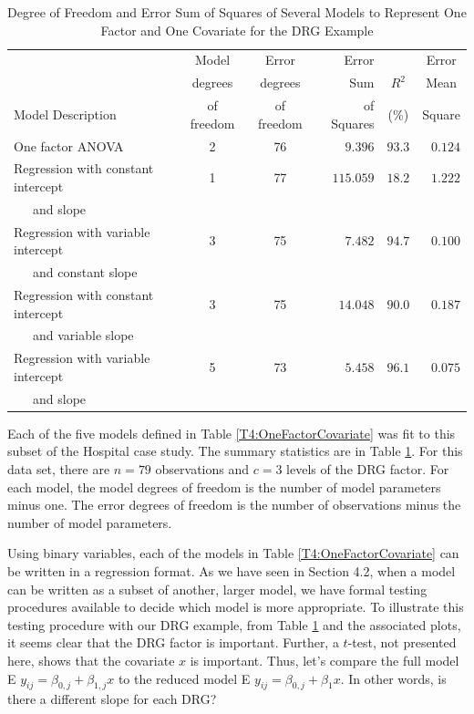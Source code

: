   \begin{center}  \begin{table}[h]
\caption{\label{T4:DRGModels} Degree of Freedom and Error Sum of
Squares of Several Models to Represent One Factor and One Covariate
for the DRG Example}
\begin{tabular}{lccrcc}
\hline & Model & Error & Error  &  & Error  \\
& degrees & degrees
& Sum & $R^2$  & Mean \\
Model Description & of freedom & of freedom & of Squares & (\%) &
Square
\\ \hline
One factor ANOVA & 2 &
76 & \multicolumn{1}{r}{$9.396$} & \multicolumn{1}{r}{$%
93.3$} & \multicolumn{1}{r}{$0.124$} \\
Regression with constant intercept & 1 & 77 &
\multicolumn{1}{r}{$115.059$} &
\multicolumn{1}{r}{$18.2$} & \multicolumn{1}{r}{$1.222$} \\
~~~and slope & & & & &  \\
Regression with variable intercept &3 & 75 &
\multicolumn{1}{r}{$7.482$} &
\multicolumn{1}{r}{$94.7$} & \multicolumn{1}{r}{$0.100$} \\
~~~and constant slope &  & &  &  &  \\
Regression with constant intercept & 3 & 75 &
\multicolumn{1}{r}{$14.048$} &
\multicolumn{1}{r}{$90.0$} & \multicolumn{1}{r}{$0.187$} \\
~~~and variable slope &  &  &  &  & \\
Regression with variable intercept & 5 & 73 &
\multicolumn{1}{r}{$5.458$} &
\multicolumn{1}{r}{$96.1$} & \multicolumn{1}{r}{$0.075$} \\
~~~and slope &  & & &  &  \\
\hline
\end{tabular}

\end{table}  \end{center} 


Each of the five models defined in Table \ref{T4:OneFactorCovariate}
was fit to this subset of the Hospital case study. The summary
statistics are in Table \ref{T4:DRGModels}. For this data set, there
are $n=79$ observations and $c=3$ levels of the DRG factor. For each
model, the model degrees of freedom is the number of model
parameters minus one. The error degrees of freedom is the number of
observations minus the number of model parameters.


Using binary variables, each of the models in Table
\ref{T4:OneFactorCovariate} can be written in a regression format.
As we have seen in Section 4.2, when a model can be written as a
subset of another, larger model, we have formal testing procedures
available to decide which model is more appropriate. To illustrate
this testing procedure with our DRG example, from Table
\ref{T4:DRGModels} and the associated plots, it seems clear that the
DRG factor is important. Further, a $t$-test, not presented here,
shows that the
covariate $x$ is important. Thus, let's compare the full model E $%
y_{ij}=\beta_{0,j}+\beta_{1,j}x$ to the reduced model E
$y_{ij}=\beta_{0,j}+\beta_1x$. In other words, is there a different
slope for each DRG?

